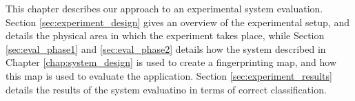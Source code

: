 This chapter describes our approach to an experimental system evaluation.
Section \ref{sec:experiment_design} gives an overview of the experimental setup, and details the physical area in which the experiment takes place, while Section \ref{sec:eval_phase1} and \ref{sec:eval_phase2} details how the system described in Chapter \ref{chap:system_design} is used to create a fingerprinting map, and how this map is used to evaluate the application.
Section \ref{sec:experiment_results} details the results of the system evaluatino in terms of correct classification.